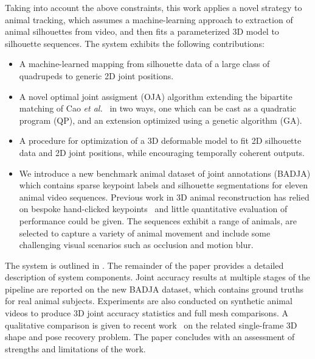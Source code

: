 Taking into account the above constraints, this work applies a novel strategy to animal tracking, which assumes a machine-learning approach to extraction of animal silhouettes from video, and then fits a parameterized 3D model to silhouette sequences.  The system exhibits the following contributions:
\begin{itemize}
\item A machine-learned mapping from silhouette data of a large class of quadru\-peds to generic 2D joint positions.
\item A novel optimal joint assigment (OJA) algorithm extending the bipartite matching of Cao {\em et al.}~\cite{cao2017realtime} in two ways, one which can be cast as a quadratic program (QP), and an extension optimized using a genetic algorithm (GA).
\item A procedure for optimization of a 3D deformable model to fit 2D silhouette data and 2D joint positions, while encouraging temporally coherent outputs.
\item We introduce a new benchmark animal dataset of joint annotations (BADJA) which contains sparse keypoint labels and silhouette segmentations for eleven animal video sequences. 
Previous work in 3D animal reconstruction has relied on bespoke hand-clicked keypoints~\cite{zuffi2017menagerie,zuffi_lions} and little quantitative evaluation of performance could be given.
The sequences exhibit a range of animals, are selected to capture a variety of animal movement and include some challenging visual scenarios such as occlusion and motion blur.
\end{itemize}

The system is outlined in .  The remainder of the paper provides a detailed description of system components.  Joint accuracy results at multiple stages of the pipeline are reported on the new BADJA dataset, which contains ground truths for real animal subjects. Experiments are also conducted on synthetic animal videos to produce 3D joint accuracy statistics and full mesh comparisons. A qualitative comparison is given to recent work~\cite{zuffi2017menagerie} on the related single-frame 3D shape and pose recovery problem. The paper concludes with an assessment of strengths and limitations of the work.


